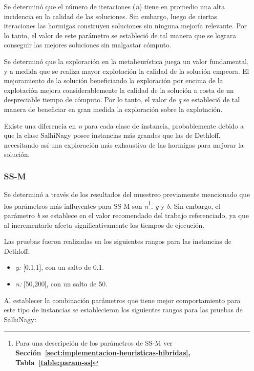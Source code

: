 Se determinó que el número de iteraciones (\emph{n}) tiene en promedio una alta incidencia en la calidad de las so\-lu\-cio\-nes. Sin embargo, luego de ciertas iteraciones las hormigas construyen soluciones sin ninguna mejoría relevante. Por lo tanto, el valor de este parámetro se estableció de tal manera que se lograra conseguir las mejores soluciones sin malgastar cómputo.

Se determinó que la exploración en la metaheurística juega un valor fundamental, y a medida que se realiza mayor explotación la calidad de la solución empeora. El mejoramiento de la solución beneficiando la exploración por encima de la explotación mejora considerablemente la calidad de la solución a costa de un despreciable tiempo de cómputo. Por lo tanto, el valor de \emph{q} se estableció de tal manera de beneficiar en gran medida la exploración sobre la explotación.

Existe una diferencia en \emph{n} para cada clase de instancia, probablemente debido a que la clase SalhiNagy posee instancias más grandes que las de Dethloff, necesitando así una exploración más exhaustiva de las hormigas para mejorar la solución.\\

\subsubsection*{SS-M}

Se determinó a través de los resultados del muestreo previamente mencionado que los parámetros más influyentes para SS-M son \emph{n}\footnote{Para una descripción de los parámetros de SS-M ver \textbf{Sección~\ref{sect:implementacion-heuristicas-hibridas}, Tabla~\ref{table:param-ss}}}, \emph{y} y \emph{b}. Sin embargo, el parámetro \emph{b} se establece en el valor recomendado del  trabajo referenciado, ya que al incrementarlo afecta significativamente los tiempos de ejecución.

Las pruebas fueron realizadas en los siguientes rangos para las instancias de Dethloff:

\begin{itemize}
\item \emph{y:} [0.1,1], con un salto de 0.1.
\item \emph{n:} [50,200], con un salto de 50.
\end{itemize}

Al establecer la combinación parámetros que tiene mejor comportamiento para este tipo de instancias se es\-ta\-ble\-cie\-ron los siguientes rangos para las pruebas de SalhiNagy:

